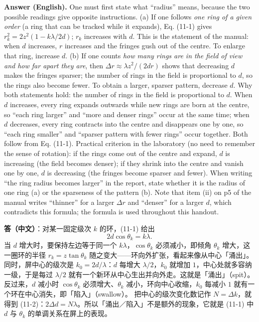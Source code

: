 \documentclass[11pt]{ctexart}
\newcommand{\Dl}{d}
\newcommand{\qaneed}[1]{\needspace{#1\textheight}}
\begin{document}
\textbf{Answer (English).} One must first state what ``radius'' means, because the two possible readings give opposite instructions.
(a) If one follows \emph{one ring of a given order} (a ring that can be tracked while it expands), Eq. (11-1) gives $r_k^2=2z^2(1-k\lambda/2\Dl)$; $r_k$ increases with $\Dl$. This is the statement of the manual: when $\Dl$ increases, $r$ increases and the fringes gush out of the centre. To enlarge that ring, increase $\Dl$.
(b) If one counts \emph{how many rings are in the field of view and how far apart they are}, then $\Delta r\approx\lambda z^2/(2\Dl r)$ shows that decreasing $\Dl$ makes the fringes sparser; the number of rings in the field is proportional to $\Dl$, so the rings also become fewer. To obtain a larger, sparser pattern, decrease $\Dl$.
Why both statements hold: the number of rings in the field is proportional to $\Dl$. When $\Dl$ increases, every ring expands outwards while new rings are born at the centre, so ``each ring larger'' and ``more and denser rings'' occur at the same time; when $\Dl$ decreases, every ring contracts into the centre and disappears one by one, so ``each ring smaller'' and ``sparser pattern with fewer rings'' occur together. Both follow from Eq. (11-1).
Practical criterion in the laboratory (no need to remember the sense of rotation): if the rings come out of the centre and expand, $\Dl$ is increasing (the field becomes denser); if they shrink into the centre and vanish one by one, $\Dl$ is decreasing (the fringes become sparser and fewer). When writing ``the ring radius becomes larger'' in the report, state whether it is the radius of one ring (a) or the sparseness of the pattern (b). Note that item (ii) on p5 of the manual writes ``thinner'' for a larger $\Delta r$ and ``denser'' for a larger $\Dl$, which contradicts this formula; the formula is used throughout this handout.

\qaneed{0.66}


\textbf{答（中文）}：对某一固定级次 $k$ 的环，(11-1) 给出
\[
  2\Dl\cos\theta_k=k\lambda .
\]
当 $\Dl$ 增大时，要保持左边等于同一个 $k\lambda$，$\cos\theta_k$ 必须减小，即倾角 $\theta_k$ 增大，这一圈环的半径 $r_k=z\tan\theta_k$ 随之变大——环向外扩张，看起来像从中心「涌出」。
同时，屏中心的级次是 $k_0=2\Dl/\lambda$：$\Dl$ 每增大 $\lambda/2$，$k_0$ 就增加 $1$，中心处就多容纳一级，于是每过 $\lambda/2$ 就有一个新环从中心生出并向外走。这就是「涌出」（spit）。
反过来，$\Dl$ 减小时 $\cos\theta_k$ 必须增大、$\theta_k$ 减小，环向中心收缩，$k_0$ 每减小 $1$ 就有一个环在中心消失，即「陷入」（swallow）。
把中心的级次变化数记作 $N=\Delta k$，就得到 (11-2)：$2\Delta\Dl=N\lambda$。所以「涌出／陷入」不是额外的现象，它就是 (11-1) 中 $\Dl$ 与 $\theta_k$ 的单调关系在屏上的表现。
\end{document}
